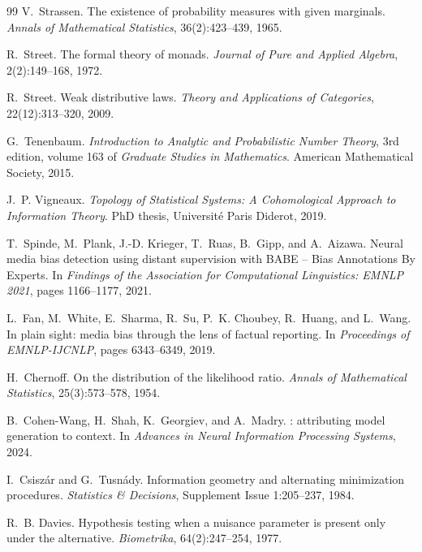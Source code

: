 \documentclass[11pt]{article}
\theoremstyle{definition}
\theoremstyle{remark}
\begin{document}
\begin{thebibliography}{99}
V.~Strassen.
\newblock The existence of probability measures with given marginals.
\newblock \emph{Annals of Mathematical Statistics}, 36(2):423--439, 1965.

R.~Street.
\newblock The formal theory of monads.
\newblock \emph{Journal of Pure and Applied Algebra}, 2(2):149--168, 1972.

R.~Street.
\newblock Weak distributive laws.
\newblock \emph{Theory and Applications of Categories}, 22(12):313--320, 2009.

G.~Tenenbaum.
\newblock \emph{Introduction to Analytic and Probabilistic Number Theory}, 3rd edition, volume 163
  of \emph{Graduate Studies in Mathematics}.
\newblock American Mathematical Society, 2015.

J.~P. Vigneaux.
\newblock \emph{Topology of Statistical Systems: A Cohomological Approach to Information Theory}.
\newblock PhD thesis, Universit\'e Paris Diderot, 2019.


T.~Spinde, M.~Plank, J.-D. Krieger, T.~Ruas, B.~Gipp, and A.~Aizawa.
\newblock Neural media bias detection using distant supervision with {BABE} -- Bias Annotations By Experts.
\newblock In \emph{Findings of the Association for Computational Linguistics: EMNLP 2021}, pages 1166--1177, 2021.

L.~Fan, M.~White, E.~Sharma, R.~Su, P.~K. Choubey, R.~Huang, and L.~Wang.
\newblock In plain sight: media bias through the lens of factual reporting.
\newblock In \emph{Proceedings of EMNLP-IJCNLP}, pages 6343--6349, 2019.

H.~Chernoff.
\newblock On the distribution of the likelihood ratio.
\newblock \emph{Annals of Mathematical Statistics}, 25(3):573--578, 1954.

B.~Cohen-Wang, H.~Shah, K.~Georgiev, and A.~Madry.
: attributing model generation to context.
\newblock In \emph{Advances in Neural Information Processing Systems}, 2024.

I.~Csisz\'ar and G.~Tusn\'ady.
\newblock Information geometry and alternating minimization procedures.
\newblock \emph{Statistics \& Decisions}, Supplement Issue 1:205--237, 1984.

R.~B. Davies.
\newblock Hypothesis testing when a nuisance parameter is present only under the alternative.
\newblock \emph{Biometrika}, 64(2):247--254, 1977.


\end{thebibliography}
\end{document}
